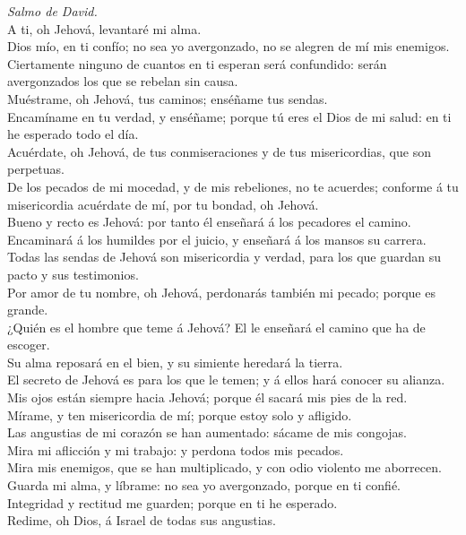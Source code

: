  \emph{Salmo de David.}\\
A ti, oh Jehová, levantaré mi alma.\\
 Dios mío, en ti confío; no sea yo avergonzado, no se
alegren de mí mis enemigos.\\
 Ciertamente ninguno de cuantos en ti esperan será
confundido: serán avergonzados los que se rebelan sin causa.\\
 Muéstrame, oh Jehová, tus caminos; enséñame tus sendas.\\
 Encamíname en tu verdad, y enséñame; porque tú eres el Dios
de mi salud: en ti he esperado todo el día.\\
 Acuérdate, oh Jehová, de tus conmiseraciones y de tus
misericordias, que son perpetuas.\\
 De los pecados de mi mocedad, y de mis rebeliones, no te
acuerdes; conforme á tu misericordia acuérdate de mí, por tu bondad, oh
Jehová.\\
 Bueno y recto es Jehová: por tanto él enseñará á los
pecadores el camino.\\
 Encaminará á los humildes por el juicio, y enseñará á los
mansos su carrera.\\
 Todas las sendas de Jehová son misericordia y verdad, para
los que guardan su pacto y sus testimonios.\\
 Por amor de tu nombre, oh Jehová, perdonarás también mi
pecado; porque es grande.\\
 ¿Quién es el hombre que teme á Jehová? El le enseñará el
camino que ha de escoger.\\
 Su alma reposará en el bien, y su simiente heredará la
tierra.\\
 El secreto de Jehová es para los que le temen; y á ellos
hará conocer su alianza.\\
 Mis ojos están siempre hacia Jehová; porque él sacará mis
pies de la red.\\
 Mírame, y ten misericordia de mí; porque estoy solo y
afligido.\\
 Las angustias de mi corazón se han aumentado: sácame de
mis congojas.\\
 Mira mi aflicción y mi trabajo: y perdona todos mis
pecados.\\
 Mira mis enemigos, que se han multiplicado, y con odio
violento me aborrecen.\\
 Guarda mi alma, y líbrame: no sea yo avergonzado, porque
en ti confié.\\
 Integridad y rectitud me guarden; porque en ti he
esperado.\\
 Redime, oh Dios, á Israel de todas sus angustias.

